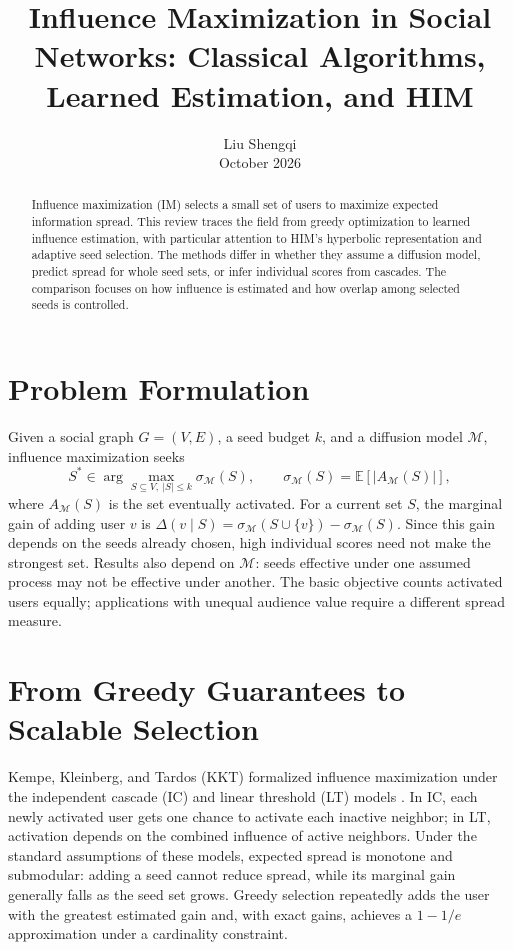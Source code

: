 \documentclass[journal]{IEEEtran}
\begin{document}
\title{Influence Maximization in Social Networks: Classical Algorithms, Learned Estimation, and HIM}
\author{Liu Shengqi\\October 2026}
\maketitle

\begin{abstract}
Influence maximization (IM) selects a small set of users to maximize expected information spread. This review traces the field from greedy optimization to learned influence estimation, with particular attention to HIM's hyperbolic representation and adaptive seed selection. The methods differ in whether they assume a diffusion model, predict spread for whole seed sets, or infer individual scores from cascades. The comparison focuses on how influence is estimated and how overlap among selected seeds is controlled.
\end{abstract}

\section{Problem Formulation}
Given a social graph $G=(V,E)$, a seed budget $k$, and a diffusion model $\mathcal{M}$, influence maximization seeks
\begin{equation}
S^* \in \arg\max_{S\subseteq V,\ |S|\leq k}
\sigma_{\mathcal{M}}(S), \qquad
\sigma_{\mathcal{M}}(S)=\mathbb{E}[|A_{\mathcal{M}}(S)|],
\end{equation}
where $A_{\mathcal{M}}(S)$ is the set eventually activated. For a current set $S$, the marginal gain of adding user $v$ is $\Delta(v\mid S)=\sigma_{\mathcal{M}}(S\cup\{v\})-\sigma_{\mathcal{M}}(S)$. Since this gain depends on the seeds already chosen, high individual scores need not make the strongest set. Results also depend on $\mathcal{M}$: seeds effective under one assumed process may not be effective under another. The basic objective counts activated users equally; applications with unequal audience value require a different spread measure.

\section{From Greedy Guarantees to Scalable Selection}
Kempe, Kleinberg, and Tardos (KKT) formalized influence maximization under the independent cascade (IC) and linear threshold (LT) models \cite{kempe}. In IC, each newly activated user gets one chance to activate each inactive neighbor; in LT, activation depends on the combined influence of active neighbors. Under the standard assumptions of these models, expected spread is monotone and submodular: adding a seed cannot reduce spread, while its marginal gain generally falls as the seed set grows. Greedy selection repeatedly adds the user with the greatest estimated gain and, with exact gains, achieves a $1-1/e$ approximation under a cardinality constraint.
\end{document}
